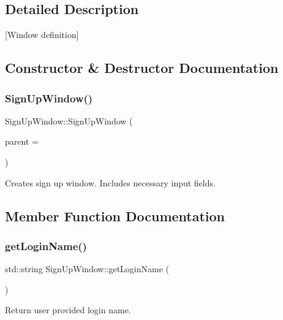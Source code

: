 \subsection{Detailed Description}
\mbox{[}Window definition\mbox{]} 

\subsection{Constructor \& Destructor Documentation}
\mbox{\label{class_sign_up_window_aaf6b145da15912da668cd6a4dc380bd5}} 
\subsubsection{\texorpdfstring{Sign\+Up\+Window()}{SignUpWindow()}}
{\footnotesize\ttfamily Sign\+Up\+Window\+::\+Sign\+Up\+Window (\begin{DoxyParamCaption}\item[{Q\+Widget $\ast$}]{parent = {} }\end{DoxyParamCaption})}

Creates sign up window. Includes necessary input fields. 

\subsection{Member Function Documentation}
\mbox{\label{class_sign_up_window_a57f7f4f906052c87ea9b0922e74ca657}} 
\subsubsection{\texorpdfstring{get\+Login\+Name()}{getLoginName()}}
{\footnotesize\ttfamily std\+::string Sign\+Up\+Window\+::get\+Login\+Name (\begin{DoxyParamCaption}{ }\end{DoxyParamCaption})}

Return user provided login name. \mbox{\label{class_sign_up_window_aa12ab939d6f9ff106c0190c2b330259c}} 
